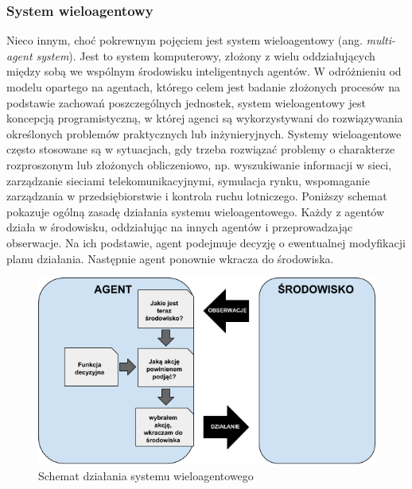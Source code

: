 \subsubsection{System wieloagentowy}
    Nieco innym, choć pokrewnym pojęciem jest system wieloagentowy (ang. \textit{multi-agent system}). Jest to system komputerowy, złożony z wielu oddziałujących między sobą we wspólnym środowisku inteligentnych agentów. W odróżnieniu od modelu opartego na agentach, którego celem jest badanie złożonych procesów na podstawie zachowań poszczególnych jednostek, system wieloagentowy jest koncepcją programistyczną, w której agenci są wykorzystywani do rozwiązywania określonych problemów praktycznych lub inżynieryjnych. Systemy wieloagentowe często stosowane są w sytuacjach, gdy trzeba rozwiązać problemy o charakterze rozproszonym lub złożonych obliczeniowo, np. wyszukiwanie informacji w sieci, zarządzanie sieciami telekomunikacyjnymi, symulacja rynku, wspomaganie zarządzania w przedsiębiorstwie i kontrola ruchu lotniczego\cite{wiki-agent}. Poniższy schemat pokazuje ogólną zasadę działania systemu wieloagentowego. Każdy z agentów działa w środowisku, oddziałując na innych agentów i przeprowadzając obserwacje. Na ich podstawie, agent podejmuje decyzję o ewentualnej modyfikacji planu działania. Następnie agent ponownie wkracza do środowiska.
    \begin{figure}[h]
        \caption{Schemat działania systemu wieloagentowego}
        \includegraphics[width=\textwidth]{images/mopsim/multi-agent.png}
    \end{figure}
